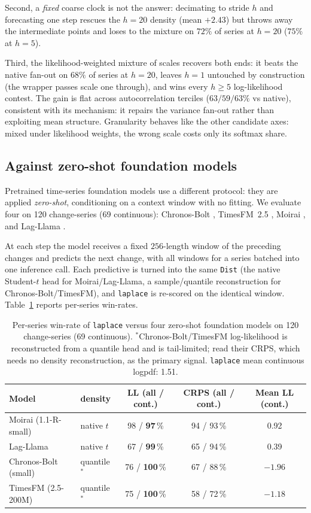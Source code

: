 \documentclass[article]{jss}
\providecommand{\code}[1]{\texttt{#1}}
\begin{document}
Second, a \emph{fixed} coarse clock is not the answer:
decimating to stride $h$ and forecasting one step rescues the $h=20$ density
(mean $+2.43$) but throws away the intermediate points and loses to the mixture
on $72\%$ of series at $h=20$ ($75\%$ at $h=5$).

Third, the likelihood-weighted
mixture of scales recovers both ends: it beats the native fan-out on $68\%$ of
series at $h=20$, leaves $h=1$ untouched by construction (the wrapper passes
scale one through), and wins every $h\ge5$ log-likelihood contest. The gain is flat across autocorrelation terciles ($63/59/63\%$ vs
native), consistent with its mechanism: it repairs the variance fan-out rather
than exploiting mean structure. Granularity behaves like the other candidate
axes: mixed under likelihood weights, the wrong scale costs only its softmax
share.

\subsection{Against zero-shot foundation models} \label{sec:foundation}

Pretrained time-series foundation models use a different protocol:
they are applied \emph{zero-shot}, conditioning on a context window with no
fitting. We evaluate four on 120 change-series (69 continuous):
Chronos-Bolt \citep{ansari2024chronos}, TimesFM~2.5 \citep{das2024timesfm},
Moirai \citep{woo2024moirai}, and Lag-Llama \citep{rasul2023lagllama}.

At each step the model receives a fixed
$256$-length window of the preceding changes and predicts the next change, with
all windows for a series batched into one inference call. Each predictive is
turned into the same \code{Dist} (the native Student-$t$ head for
Moirai/Lag-Llama, a sample/quantile reconstruction for Chronos-Bolt/TimesFM),
and \code{laplace} is re-scored on the identical window. Table~\ref{tab:foundation}
reports per-series win-rates.

\begin{table}[t!]
\centering
\begin{tabular}{llccc}
\toprule
Model & density & LL (all / cont.) & CRPS (all / cont.) & Mean LL (cont.) \\
\midrule
Moirai (1.1-R-small)  & native $t$    & 98 / \textbf{97}\,\% & 94 / 93\,\% & 0.92 \\
Lag-Llama             & native $t$    & 67 / \textbf{99}\,\% & 65 / 94\,\% & 0.39 \\
Chronos-Bolt (small)  & quantile$^{*}$ & 76 / \textbf{100}\,\% & 67 / 88\,\% & $-1.96$ \\
TimesFM (2.5-200M)    & quantile$^{*}$ & 75 / \textbf{100}\,\% & 58 / 72\,\% & $-1.18$ \\
\bottomrule
\end{tabular}
\caption{Per-series win-rate of \code{laplace} versus four zero-shot foundation
models on 120 change-series (69 continuous). $^{*}$Chronos-Bolt/TimesFM
log-likelihood is reconstructed from a quantile head and is tail-limited; read
their CRPS, which needs no density reconstruction, as the primary signal. \code{laplace} mean continuous logpdf:
1.51.}
\label{tab:foundation}
\end{table}
\end{document}
